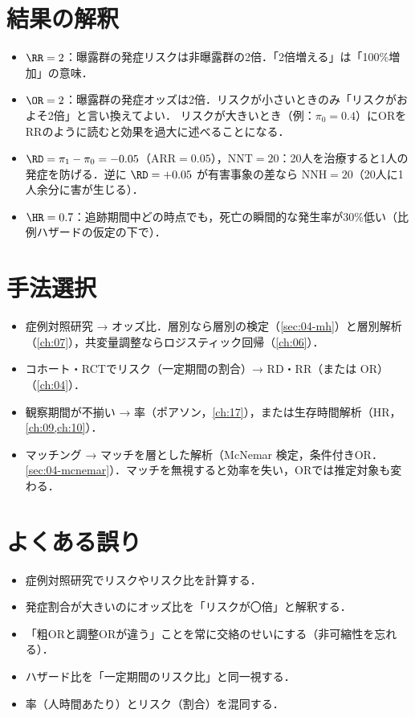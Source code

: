 \section{結果の解釈}\label{sec:02-interp}
\begin{itemize}
\item $\RR=2$：曝露群の発症リスクは非曝露群の2倍．「2倍増える」は「100\%増加」の意味．
\item $\OR=2$：曝露群の発症オッズは2倍．リスクが小さいときのみ「リスクがおよそ2倍」と言い換えてよい．
      リスクが大きいとき（例：$\pi_0=0.4$）にORをRRのように読むと効果を過大に述べることになる．
\item $\RD=\pi_1-\pi_0=-0.05$（$\mathrm{ARR}=0.05$），$\mathrm{NNT}=20$：20人を治療すると1人の発症を防げる．逆に $\RD=+0.05$ が有害事象の差なら $\mathrm{NNH}=20$（20人に1人余分に害が生じる）．
\item $\HR=0.7$：追跡期間中どの時点でも，死亡の瞬間的な発生率が30\%低い（比例ハザードの仮定の下で）．
\end{itemize}

\section{手法選択}\label{sec:02-choice}
\begin{itemize}
\item 症例対照研究 → オッズ比．層別なら層別の検定（\cref{sec:04-mh}）と層別解析（\cref{ch:07}），共変量調整ならロジスティック回帰（\cref{ch:06}）．
\item コホート・RCTでリスク（一定期間の割合）→ RD・RR（または OR）（\cref{ch:04}）．
\item 観察期間が不揃い → 率（ポアソン，\cref{ch:17}），または生存時間解析（HR，\cref{ch:09,ch:10}）．
\item マッチング → マッチを層とした解析（McNemar 検定，条件付きOR．\cref{sec:04-mcnemar}）．マッチを無視すると効率を失い，ORでは推定対象も変わる．
\end{itemize}

\section{よくある誤り}\label{sec:02-err}
\begin{warnbox}
\begin{itemize}
\item 症例対照研究でリスクやリスク比を計算する．
\item 発症割合が大きいのにオッズ比を「リスクが〇倍」と解釈する．
\item 「粗ORと調整ORが違う」ことを常に交絡のせいにする（非可縮性を忘れる）．
\item ハザード比を「一定期間のリスク比」と同一視する．
\item 率（人時間あたり）とリスク（割合）を混同する．
\end{itemize}
\end{warnbox}

